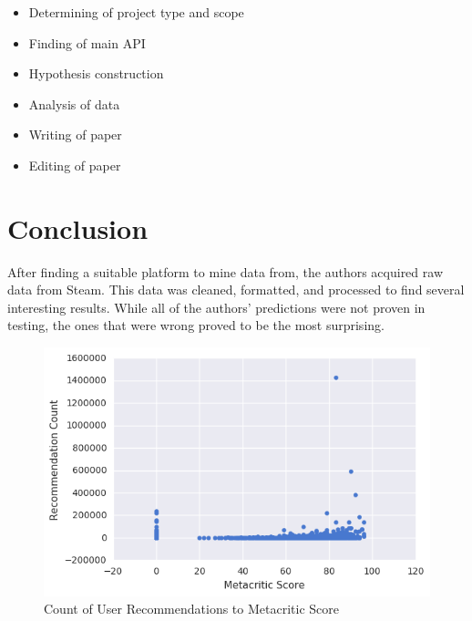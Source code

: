\documentclass[letterpaper,10pt,twocolumn]{article}
\begin{document}
\begin{itemize}
    \item Determining of project type and scope
    \item Finding of main API
    \item Hypothesis construction
    \item Analysis of data
    \item Writing of paper
    \item Editing of paper
\end{itemize}


\section{Conclusion}

After finding a suitable platform to mine data from, the authors acquired raw
data from Steam. This data was cleaned, formatted, and processed to find
several interesting results. While all of the authors' predictions were not
proven in testing, the ones that were wrong proved to be the most surprising.


\nocite{*}

\printbibliography


\begin{figure}[p]
    \caption{Count of User Recommendations to Metacritic Score \label{fig:metacritic-recommendations-all}}
    \includegraphics[width=\textwidth,keepaspectratio]{metacritic-recommendations-scatter-all}
\end{figure}
\end{document}
